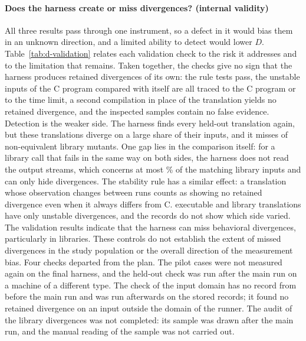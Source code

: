 \paragraph{Does the harness create or miss divergences? (internal validity)} All three results pass through one instrument, so a defect in it would bias them in an unknown direction, and a limited ability to detect would lower $D$. Table~\ref{tab:d-validation} relates each validation check to the risk it addresses and to the limitation that remains. Taken together, the checks give no sign that the harness produces retained divergences of its own: the rule tests pass, the unstable inputs of the C program compared with itself are all traced to the C program or to the time limit, a second compilation in place of the translation yields no retained divergence, and the inspected samples contain no false evidence. Detection is the weaker side. The harness finds every held-out translation again, but these translations diverge on a large share of their inputs, and it misses \sMutLibNeNotCaught{} of \sMutLibN{} non-equivalent library mutants. One gap lies in the comparison itself: for a library call that fails in the same way on both sides, the harness does not read the output streams, which concerns at most \rqLibGapUpperLibPct\% of the matching library inputs and can only hide divergences. The stability rule has a similar effect: a translation whose observation changes between runs counts as showing no retained divergence even when it always differs from C. \rqUnstableOnlyExeAllNum{} executable and \rqUnstableOnlyLibAllNum{} library translations have only unstable divergences, and the records do not show which side varied. The validation results indicate that the harness can miss behavioral divergences, particularly in libraries. These controls do not establish the extent of missed divergences in the study population or the overall direction of the measurement bias. Four checks departed from the plan. The pilot cases were not measured again on the final harness, and the held-out check was run after the main run on a machine of a different type. The check of the input domain has no record from before the main run and was run afterwards on the stored records; it found no retained divergence on an input outside the domain of the runner. The audit of the library divergences was not completed: its sample was drawn after the main run, and the manual reading of the sample was not carried out.

